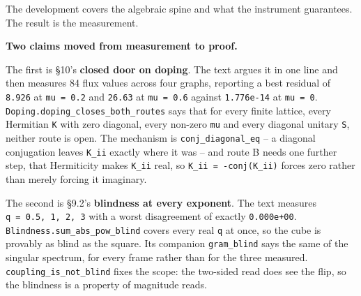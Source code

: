 \documentclass[10pt,letterpaper,twocolumn]{article}
\begin{document}
The development covers the algebraic spine and what the instrument guarantees. The result is the
measurement.

\textbf{Two claims moved from measurement to proof.}

The first is §10's \textbf{closed door on doping}. The text argues it in one line and then measures 84
flux values across four graphs, reporting a best residual of \texttt{8.\allowbreak{}926} at \texttt{mu\ =\allowbreak{}\ 0.\allowbreak{}2} and \texttt{26.\allowbreak{}63} at
\texttt{mu\ =\allowbreak{}\ 0.\allowbreak{}6} against \texttt{1.\allowbreak{}776e-{}\allowbreak{}14} at \texttt{mu\ =\allowbreak{}\ 0}. \texttt{Doping.\allowbreak{}doping\_\allowbreak{}closes\_\allowbreak{}both\_\allowbreak{}routes} says that for every
finite lattice, every Hermitian
\texttt{K} with zero diagonal, every non-zero \texttt{mu} and every diagonal unitary \texttt{S}, neither route is open.
The mechanism is \texttt{conj\_\allowbreak{}diagonal\_\allowbreak{}eq} -- a diagonal conjugation leaves \texttt{K\_\allowbreak{}ii} exactly where it was --
and route B needs one further step, that Hermiticity makes \texttt{K\_\allowbreak{}ii} real, so \texttt{K\_\allowbreak{}ii\ =\allowbreak{}\ -{}\allowbreak{}conj(\allowbreak{}K\_\allowbreak{}ii)\allowbreak{}}
forces zero rather than merely forcing it imaginary.

The second is §9.2's \textbf{blindness at every exponent}. The text measures \texttt{q\ =\allowbreak{}\ 0.\allowbreak{}5,\allowbreak{}\ 1,\allowbreak{}\ 2,\allowbreak{}\ 3} with a
worst disagreement of exactly \texttt{0.\allowbreak{}000e+\allowbreak{}00}. \texttt{Blindness.\allowbreak{}sum\_\allowbreak{}abs\_\allowbreak{}pow\_\allowbreak{}blind} covers every real \texttt{q} at
once, so the cube is provably as blind as the square. Its companion \texttt{gram\_\allowbreak{}blind} says the same of
the singular spectrum, for every frame rather than for
the three measured. \texttt{coupling\_\allowbreak{}is\_\allowbreak{}not\_\allowbreak{}blind} fixes the scope: the two-sided read does see the flip,
so the blindness is a property of magnitude reads.
\end{document}
